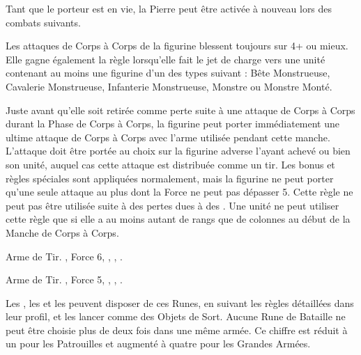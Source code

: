 Tant que le porteur est en vie, la Pierre peut être activée à nouveau lors des combats suivants.

\armyspecialruleentry{\thebiggertheyare}

Les attaques de Corps à Corps de la figurine blessent toujours sur 4+ ou mieux. Elle gagne également la règle \swiftstride{} lorsqu'elle fait le jet de charge vers une unité contenant au moins une figurine d'un des types suivant : Bête Monstrueuse, Cavalerie Monstrueuse, Infanterie Monstrueuse, Monstre ou Monstre Monté.

\armyspecialruleentry{\comewithme}

Juste avant qu'elle soit retirée comme perte suite à une attaque de Corps à Corps durant la Phase de Corps à Corps, la figurine peut porter immédiatement une ultime attaque de Corps à Corps avec l'arme utilisée pendant cette manche. L'attaque doit être portée au choix sur la figurine adverse l'ayant achevé ou bien son unité, auquel cas cette attaque est distribuée comme un tir. Les bonus et règles spéciales sont appliquées normalement, mais la figurine ne peut porter qu'une seule attaque au plus dont la Force ne peut pas dépasser 5. Cette règle ne peut pas être utilisée suite à des pertes dues à des \impacthits{}. Une unité ne peut utiliser cette règle que si elle a au moins autant de rangs que de colonnes au début de la Manche de Corps à Corps.

\closearmyspecialrules






\vspace*{1.5cm}
\startarmyarmoury

\startitemlistonecol

\listitemonecol{\wyrmslayerrocket} Arme de Tir. , Force 6, \flamingattacks{}, , \reload{}.

\listitemonecol{\forgerepeater} Arme de Tir. , Force 5, \flamingattacks{}, , \quicktofire{}.

\enditemlistonecol

\closearmyarmoury





\subtitle{}

Les \runicmasters{}, les \runicsmiths{} et les \anvilsofpower{} peuvent disposer de ces Runes, en suivant les règles détaillées dans leur profil, et les lancer comme des Objets de Sort. Aucune Rune de Bataille ne peut être choisie plus de deux fois dans une même armée. Ce chiffre est réduit à un pour les Patrouilles et augmenté à quatre pour les Grandes Armées.

